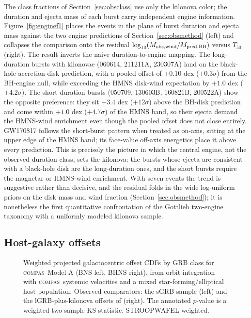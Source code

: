 \documentclass[twocolumn,amsmath]{aastex702}
\newcommand{\compas}{\textsc{compas}}
\begin{document}
The class fractions of Section~\ref{sec:obsclass} use only the kilonova color;
the duration and ejecta mass of each burst carry independent engine information.
Figure~\ref{fig:enginef1} places the \citet{rastinejad2024} events in the
plane of burst duration and ejecta mass against the two engine predictions of
Section~\ref{sec:obsmethod} (left) and collapses the comparison onto the
residual $\log_{10}(M_{\rm obs,wind}/M_{\rm pred,BH})$ versus $T_{50}$ (right).
The result inverts the naive duration-to-engine mapping. The
long-duration bursts with kilonovae (060614, 211211A, 230307A) land on the
black-hole accretion-disk prediction, with a pooled offset of $+0.10$ dex
($+0.3\sigma$) from the BH-engine null, while exceeding the HMNS disk-wind
expectation by $+1.0$ dex ($+4.2\sigma$). The short-duration bursts (050709,
130603B, 160821B, 200522A) show the opposite preference: they sit $+3.4$ dex
($+12\sigma$) above the BH-disk prediction and come within $+1.0$ dex
($+4.7\sigma$) of the HMNS band, so their ejecta demand the HMNS-wind
enrichment even though the pooled offset does not close entirely. GW170817
follows the short-burst pattern when treated as on-axis, sitting at the upper
edge of the HMNS band; its face-value off-axis energetics place it above every
prediction. This is precisely the \citet{gottlieb2024} picture in which the central
engine, not the observed duration class, sets the kilonova: the bursts whose
ejecta are consistent with a black-hole disk are the long-duration ones, and the
short bursts require the magnetar or HMNS-wind enrichment. With seven events the
trend is suggestive rather than decisive, and the residual folds in the wide
log-uniform priors on the disk mass and wind fraction
(Section~\ref{sec:obsmethod}); it is nonetheless the first quantitative
confrontation of the Gottlieb two-engine taxonomy with a uniformly modeled
kilonova sample.

\subsection{Host-galaxy offsets} \label{sec:offsets}

\begin{figure}[tbp]
\caption{Weighted projected galactocentric offset CDFs by GRB class for \compas\
Model A (BNS left, BHNS right), from \citet{hernquist1990} orbit integration with
\compas\ systemic velocities and a mixed star-forming/elliptical host
population. Observed comparators: the \citet{fong2013} sGRB sample (left) and the
lGRB-plus-kilonova offsets of \citet{dellavalle2006,rastinejad2022,levan2024}
(right). The
annotated $p$-value is a weighted two-sample KS statistic. STROOPWAFEL-weighted.
\label{fig:offsets}}
\end{figure}
\end{document}
